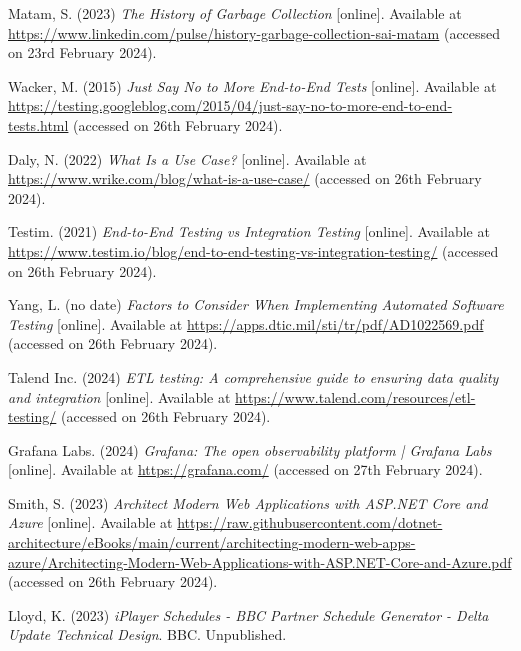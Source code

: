 \noindent Matam, S. (2023) \textit{The History of Garbage Collection} [online]. Available at \url{https://www.linkedin.com/pulse/history-garbage-collection-sai-matam} (accessed on 23rd February 2024).
\vspace{0.2cm}

\noindent Wacker, M. (2015) \textit{Just Say No to More End-to-End Tests} [online]. Available at \url{https://testing.googleblog.com/2015/04/just-say-no-to-more-end-to-end-tests.html} (accessed on 26th February 2024).
\vspace{0.2cm}

\noindent Daly, N. (2022) \textit{What Is a Use Case?} [online]. Available at \url{https://www.wrike.com/blog/what-is-a-use-case/} (accessed on 26th February 2024).
\vspace{0.2cm}

\noindent Testim. (2021) \textit{End-to-End Testing vs Integration Testing} [online]. Available at \url{https://www.testim.io/blog/end-to-end-testing-vs-integration-testing/} (accessed on 26th February 2024).
\vspace{0.2cm}

\noindent Yang, L. (no date) \textit{Factors to Consider When Implementing Automated Software Testing} [online]. Available at \url{https://apps.dtic.mil/sti/tr/pdf/AD1022569.pdf} (accessed on 26th February 2024).
\vspace{0.2cm}

\noindent Talend Inc. (2024) \textit{ETL testing: A comprehensive guide to ensuring data quality and integration} [online]. Available at \url{https://www.talend.com/resources/etl-testing/} (accessed on 26th February 2024).
\vspace{0.2cm}

\noindent Grafana Labs. (2024) \textit{Grafana: The open observability platform | Grafana Labs} [online]. Available at \url{https://grafana.com/} (accessed on 27th February 2024).
\vspace{0.2cm}

\noindent Smith, S. (2023) \textit{Architect Modern Web Applications with ASP.NET Core and Azure} [online]. Available at \url{https://raw.githubusercontent.com/dotnet-architecture/eBooks/main/current/architecting-modern-web-apps-azure/Architecting-Modern-Web-Applications-with-ASP.NET-Core-and-Azure.pdf} (accessed on 26th February 2024).
\vspace{0.2cm}

\noindent Lloyd, K. (2023) \textit{iPlayer Schedules - BBC Partner Schedule Generator - Delta Update Technical Design}. BBC. Unpublished.
\vspace{0.2cm}

\newpage
